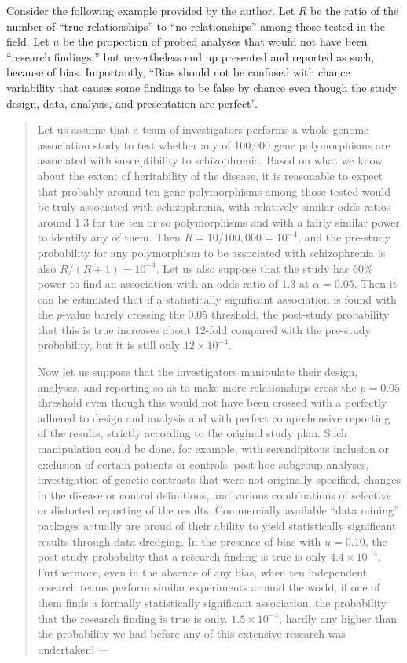 \documentclass[
]{book}
\begin{document}
Consider the following example provided by the author. Let \(R\) be the ratio of the number of ``true relationships'' to ``no relationships'' among those tested in the field. Let \(u\) be the proportion of probed analyses that would not have been ``research findings,'' but nevertheless end up presented and reported as such, because of bias. Importantly, ``Bias should not be confused with chance variability that causes some findings to be false by chance even though the study design, data, analysis, and presentation are perfect''.

\begin{quote}
Let us assume that a team of investigators performs a whole genome association study to test whether any of 100,000 gene polymorphisms are associated with susceptibility to schizophrenia. Based on what we know about the extent of heritability of the disease, it is reasonable to expect that probably around ten gene polymorphisms among those tested would be truly associated with schizophrenia, with relatively similar odds ratios around 1.3 for the ten or so polymorphisms and with a fairly similar power to identify any of them. Then \(R = 10/100,000 = 10^{−4}\), and the pre-study probability for any polymorphism to be associated with schizophrenia is also \(R/(R + 1) = 10^{−4}\). Let us also suppose that the study has 60\% power to find an association with an odds ratio of 1.3 at \(\alpha = 0.05\). Then it can be estimated that if a statistically significant association is found with the \(p\)-value barely crossing the 0.05 threshold, the post-study probability that this is true increases about 12-fold compared with the pre-study probability, but it is still only \(12 × 10^{−4}\).

Now let us suppose that the investigators manipulate their design, analyses, and reporting so as to make more relationships cross the \(p = 0.05\) threshold even though this would not have been crossed with a perfectly adhered to design and analysis and with perfect comprehensive reporting of the results, strictly according to the original study plan. Such manipulation could be done, for example, with serendipitous inclusion or exclusion of certain patients or controls, post hoc subgroup analyses, investigation of genetic contrasts that were not originally specified, changes in the disease or control definitions, and various combinations of selective or distorted reporting of the results. Commercially available ``data mining'' packages actually are proud of their ability to yield statistically significant results through data dredging. In the presence of bias with \(u = 0.10\), the post-study probability that a research finding is true is only \(4.4 × 10^{−4}\). Furthermore, even in the absence of any bias, when ten independent research teams perform similar experiments around the world, if one of them finds a formally statistically significant association, the probability that the research finding is true is only. \(1.5 × 10^{-4}\), hardly any higher than the probability we had before any of this extensive research was undertaken! --- \citep{ioannidis2005most}
\end{quote}
\end{document}

